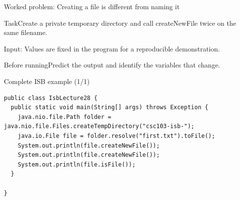 \documentclass[10pt,aspectratio=169]{beamer}
\begin{document}
\begin{frame}[fragile,t]{Worked problem: Creating a file is different from naming it}
\begin{block}{Task}Create a private temporary directory and call createNewFile twice on the same filename.\end{block}
\small Input: Values are fixed in the program for a reproducible demonstration.\par\vspace{3mm}\begin{exampleblock}{Before running}Predict the output and identify the variables that change.\end{exampleblock}
\end{frame}

\begin{frame}[fragile,t]{Complete ISB example (1/1)}
\begin{lstlisting}
public class IsbLecture28 {
  public static void main(String[] args) throws Exception {
    java.nio.file.Path folder = java.nio.file.Files.createTempDirectory("csc103-isb-");
    java.io.File file = folder.resolve("first.txt").toFile();
    System.out.println(file.createNewFile());
    System.out.println(file.createNewFile());
    System.out.println(file.isFile());
  }

}
\end{lstlisting}
\end{frame}
\end{document}
